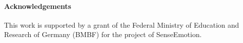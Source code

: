 \documentclass[runningheads]{llncs}
\begin{document}
\paragraph{Acknowledgements}
This work is supported by a grant of the Federal Ministry of Education and Research of Germany (BMBF) for the project of SenseEmotion.



%
%
%
 
 
%




\end{document}
